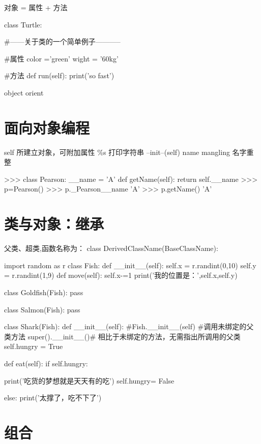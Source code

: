 \documentclass[a4paper,10pt]{ctexart}
\begin{document}
对象 = 属性 + 方法
\begin{python}
class Turtle:

#------关于类的一个简单例子-----------

#属性
color ='green'
wight = '60kg'

#方法
def run(self):
print('so fast')
\end{python}

object orient


\section{面向对象编程}

self 所建立对象，可附加属性  \%s 打印字符串
--init--(self)
name mangling 名字重整
\begin{python}
>>> class Pearson:
__name = 'A'
def getName(self):
return self.__name
>>> p=Pearson()
>>> p._Pearson__name
'A'
>>> p.getName()
'A'
\end{python}
\section{类与对象：继承}

父类、超类,函数名称为：
class DerivedClassName(BaseClassName):
\begin{python}
import random as r
class Fish:
    def __init__(self):
        self.x = r.randint(0,10)
        self.y = r.randint(1,9)
    def move(self):
        self.x-=1
        print('我的位置是：',self.x,self.y)


class Goldfish(Fish):
    pass

class Salmon(Fish):
    pass

class Shark(Fish):
    def __init__(self):
        #Fish.__init__(self) #调用未绑定的父类方法
        super().__init__()# 相比于未绑定的方法，无需指出所调用的父类
        self.hungry = True

    def eat(self):
        if self.hungry:

            print('吃货的梦想就是天天有的吃')
            self.hungry= False

        else:
        print('太撑了，吃不下了')
	
\end{python}

\section{组合}
\end{document}
